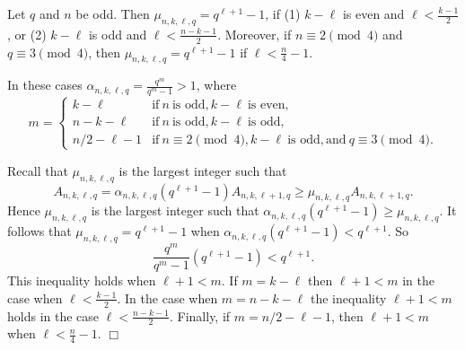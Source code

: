 \documentclass[10pt,a4paper]{amsart}
\newenvironment{proof}{\noindent {\em Proof.}}{\hspace*{\fill} $\Box $\newline}
\begin{document}
\begin{proposition}\label{prop:oddq}
Let $q$ and $n$ be odd. Then $\mu_{n,k,\ell,q}=q^{\ell+1}-1$, if (1) $k-\ell$ is even and $\ell<\frac{k-1}{2}$, or (2) $k-\ell$ is odd and $\ell<\frac{n-k-1}{2}$.
Moreover, if $n\equiv 2\pmod 4$ and $q\equiv 3\pmod 4$, then $\mu_{n,k,\ell,q}=q^{\ell+1}-1$ if $\ell<\frac{n}{4}-1$.
\end{proposition}

\begin{proof} In these cases $\alpha_{n,k,\ell,q}=\frac{q^m}{q^m-1}>1$, where
\[
m=\left\{\begin{array}{ll}
k-\ell&\mbox{if} \ n \ \mbox{is odd}, k-\ell \ \mbox{is even},\\
n-k-\ell&\mbox{if} \ n \ \mbox{is odd}, k-\ell \ \mbox{is odd},\\
n/2-\ell-1&\mbox{if} \ n\equiv 2\pmod 4, k-\ell \ \mbox{is odd}, \mbox{and} \ q\equiv 3\pmod 4.
\end{array}\right.
\]

Recall that $\mu_{n,k,\ell,q}$ is the largest integer such that
$$A_{n,k,\ell,q}=\alpha_{n,k,\ell,q}(q^{\ell+1}-1)A_{n,k,\ell+1,q} \ge \mu_{n,k,\ell,q} A_{n,k,\ell+1,q}.$$
Hence $\mu_{n,k,\ell,q}$ is the largest integer such that
$\alpha_{n,k,\ell,q}(q^{\ell+1}-1) \ge \mu_{n,k,\ell,q} $.
It follows that $\mu_{n,k,\ell,q}=q^{\ell+1}-1$ when $\alpha_{n,k,\ell,q}(q^{\ell+1}-1)<q^{\ell+1}$. So
$$\frac{q^m}{q^m-1}(q^{\ell+1}-1)<q^{\ell+1}.$$
This inequality holds when $\ell+1<m$. If $m=k-\ell$ then $\ell+1<m$ in the case when $\ell<\frac{k-1}{2}$. In the case when $m=n-k-\ell$ the inequality $\ell+1<m$ holds in the case $\ell<\frac{n-k-1}{2}$. Finally, if $m=n/2-\ell-1$, then $\ell+1<m$ when $\ell<\frac{n}{4}-1$.
\end{proof}
\end{document}
